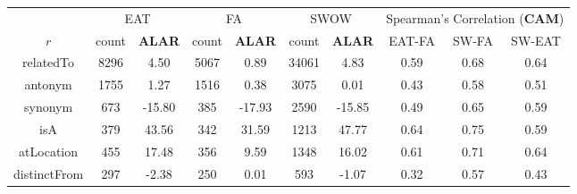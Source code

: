 \documentclass[letterpaper]{article} %
\begin{document}
\begin{table}%
\centering
\begin{tabular}{@{}c|cc|cc|cc|ccc@{}}
   & \multicolumn{2}{c}{EAT} & \multicolumn{2}{c}{FA}  & \multicolumn{2}{c}{SWOW} & \multicolumn{3}{c}{Spearman's Correlation (\textbf{CAM})}\\

$r$ & count & \textbf{ALAR} & count & \textbf{ALAR} & count & \textbf{ALAR} & EAT-FA & SW-FA & SW-EAT \\
\hline

 relatedTo         & 	8296      & 	4.50     &	5067    & 	0.89    & 	34061     & 	4.83       & 	0.59 & 	0.68 & 	0.64 \\
antonym           & 	1755      & 	1.27     &	1516    & 	0.38    & 	3075      & 	0.01       & 	0.43 & 	0.58 & 	0.51 \\
synonym           & 	673       & 	-15.80   &	385     & 	-17.93  & 	2590      & 	-15.85     & 	0.49 & 	0.65 & 	0.59 \\
isA               & 	379       & 	43.56    &	342     & 	31.59   & 	1213       & 	47.77      & 	0.64 & 	0.75 & 	0.59 \\
atLocation        & 	455       & 	17.48    &	356     & 	9.59    & 	1348       & 	16.02      & 	0.61 & 	0.71 & 	0.64 \\
distinctFrom      & 	297       & 	-2.38    &	250     & 	0.01    & 	593       & 	-1.07      & 	0.32 & 	0.57 & 	0.43 \\

\end{tabular}
\end{table}
\end{document}
